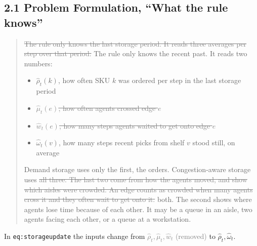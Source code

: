\documentclass[11pt,a4paper]{article}
\newcommand{\new}[1]{\textcolor{newc}{#1}}
\newcommand{\old}[1]{\textcolor{gray}{\sout{#1}}}
\newcommand{\oldmath}[1]{\textcolor{gray}{#1}}
\begin{document}
\subsection*{2.1 Problem Formulation, ``What the rule knows''}
\begin{quote}
\old{The rule only knows the last storage period. It reads three averages per
step over that period:}
\new{The rule only knows the recent past. It reads two numbers:}
\begin{itemize}
\item \(\hat\rho_t(k)\), how often SKU \(k\) was ordered \new{per step in the last storage period}
\item \old{\(\hat\mu_t(e)\), how often agents crossed edge \(e\)}
\item \old{\(\hat w_t(e)\), how many steps agents waited to get onto edge \(e\)}
\item \new{\(\hat\omega_t(v)\), how many steps recent picks from shelf \(v\) stood still, on average}
\end{itemize}
Demand storage uses only the first, the orders. Congestion-aware storage uses
\old{all three. The last two come from how the agents moved, and show which
aisles were crowded. An edge counts as crowded when many agents cross it and
they often wait to get onto it.}
\new{both. The second shows where agents lose time because of each other. It may
be a queue in an aisle, two agents facing each other, or a queue at a
workstation.}
\end{quote}

In \texttt{eq:storageupdate} the inputs change from
\oldmath{$\hat\rho_t,\hat\mu_t,\hat w_t$ (removed)} to \new{$\hat\rho_t,\hat\omega_t$}.
\end{document}
